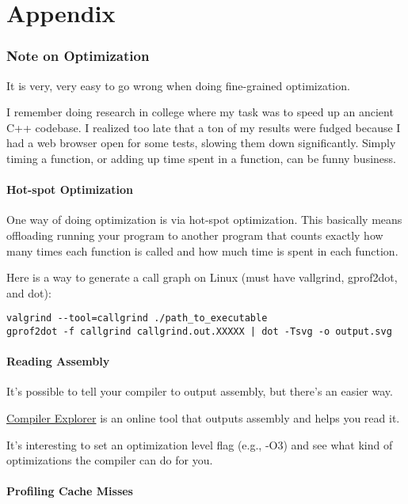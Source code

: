 \documentclass[letterpaper,11pt]{article}
\begin{document}
\newpage
\part{Appendix}
\section{Note on Optimization}

It is very, very easy to go wrong when doing fine-grained optimization.

I remember doing research in college where my task was to speed up an ancient C++ codebase. I realized too late that a ton of my results were fudged because I had a web browser open for some tests, slowing them down significantly. Simply timing a function, or adding up time spent in a function, can be funny business.

\subsection{Hot-spot Optimization}

One way of doing optimization is via hot-spot optimization. This basically means offloading running your program to another program that counts exactly how many times each function is called and how much time is spent in each function.

Here is a way to generate a call graph on Linux (must have vallgrind, gprof2dot, and dot):

\begin{verbatim}
valgrind --tool=callgrind ./path_to_executable
gprof2dot -f callgrind callgrind.out.XXXXX | dot -Tsvg -o output.svg
\end{verbatim}

\subsection{Reading Assembly}

It's possible to tell your compiler to output assembly, but there's an easier way.

\href{https://godbolt.org/}{Compiler Explorer} is an online tool that outputs assembly and helps you read it.

It's interesting to set an optimization level flag (e.g., -O3) and see what kind of optimizations the compiler can do 
for you.


\subsection{Profiling Cache Misses}
\end{document}
